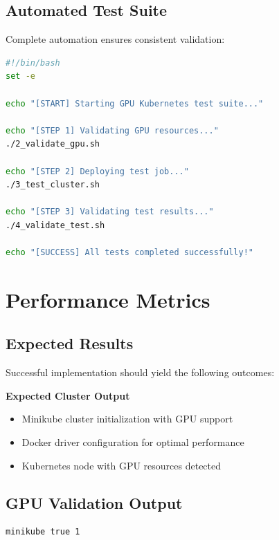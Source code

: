 \documentclass[12pt,a4paper]{report}
\begin{document}
\section{Automated Test Suite}
Complete automation ensures consistent validation:

\begin{lstlisting}[language=bash,caption=Automated Test Suite,label=lst:test-suite]
#!/bin/bash
set -e

echo "[START] Starting GPU Kubernetes test suite..."

echo "[STEP 1] Validating GPU resources..."
./2_validate_gpu.sh

echo "[STEP 2] Deploying test job..."
./3_test_cluster.sh

echo "[STEP 3] Validating test results..."
./4_validate_test.sh

echo "[SUCCESS] All tests completed successfully!"
\end{lstlisting}

\chapter{Performance Metrics}
\label{chap:performance}

\section{Expected Results}
Successful implementation should yield the following outcomes:

\begin{center}
\colorbox{primarycolor}{
    \color{white}\textbf{Expected Cluster Output}
}
\end{center}

\vspace{0.3cm}

\begin{itemize}
    \item Minikube cluster initialization with GPU support
    \item Docker driver configuration for optimal performance
    \item Kubernetes node with GPU resources detected
\end{itemize}

\section{GPU Validation Output}
\begin{lstlisting}[language=bash,caption=Expected GPU Validation Output,label=lst:gpu-output]
minikube true 1
\end{lstlisting}
\end{document}
